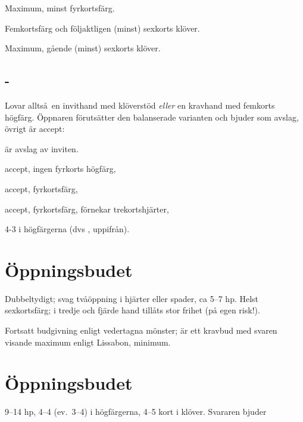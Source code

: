      \item[\ru{3}] Maximum, minst fyrkortsfärg.
     \item[\ho{3}] Femkortsf{\"a}rg och f{\"o}ljaktligen (minst) sexkorts
                     kl{\"o}ver.

     \item[\NT{3}] Maximum, g{\aa}ende (minst) sexkorts kl{\"o}ver.
   \ebe

\subsection{ - }
 Lovar allts\aa\ en invithand med klöverstöd
 {\em eller} en kravhand med femkorts
 h\"og\-f\"arg.
 {\"O}ppnaren f{\"o}rut\-s{\"a}tter den balan\-serade vari\-anten och 
  bjuder  som av\-slag, {\"o}vrigt \"ar accept: 
\bbe
   \item[\kl{3}] {\"a}r avslag av inviten.
   \item[\ru{3}] accept, ingen fyrkorts h{\"o}gf{\"a}rg, 
   \item[\hj{3}] accept, fyrkortsf{\"a}rg,
   \item[\spa{3}] accept, fyrkortsf{\"a}rg, f{\"o}rnekar trekortshj{\"a}rter, 
   \item[\NT{3}] 4-3 i h{\"o}gf{\"a}rgerna (dvs , 
               uppifr{\aa}n).
\ebe

\section{\"Oppningsbudet }

Dubbeltydigt; svag tvåöppning i hjärter eller spader, ca 5--7 hp.
Helst sex\-korts\-färg; i tredje och fjärde hand tillåts stor frihet (på egen
risk!).  

Fortsatt budgivning enligt vedertagna mönster;  är ett kravbud med
svaren  visande maximum enligt Lissabon,  minimum.

\section{\"Oppningsbudet }

9--14 hp, 4--4 (ev.\ 3--4) i högfärgerna, 4--5 kort i klöver. Svararen
bjuder

